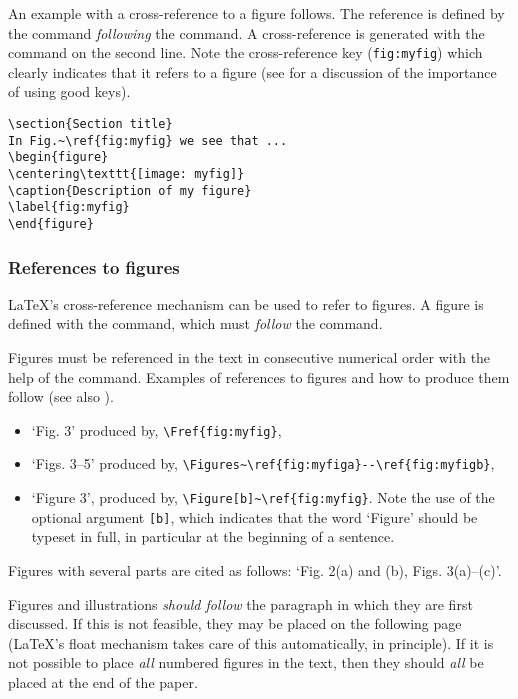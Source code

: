 \documentclass[12pt,twoside,a4paper]{cernrep}
\begin{document}
An example with a cross-reference to a figure follows. The reference
is defined by the  command \emph{following} the
 command. A cross-reference is generated with the
 command on the second line. Note the cross-reference key
(\texttt{fig:myfig}) which clearly indicates that it refers to a
figure (see  for a discussion of the importance of
using good keys).
\begin{verbatim}
\section{Section title}
In Fig.~\ref{fig:myfig} we see that ...
\begin{figure}
\centering\texttt{[image: myfig]}
\caption{Description of my figure}
\label{fig:myfig}
\end{figure}
\end{verbatim}

\subsubsection{References to figures}

\LaTeX's cross-reference mechanism can be used to refer to figures.  A
figure is defined with the  command, which must
\emph{follow} the  command.

Figures must be referenced in the text in consecutive numerical order
with the help of the  command. Examples of references to
figures and how to produce them follow (see also ).
\begin{itemize}
\item `Fig. 3' produced by, \eg \verb!\Fref{fig:myfig}!,
\item `Figs. 3--5' produced by, \eg
       \verb!\Figures~\ref{fig:myfiga}--\ref{fig:myfigb}!,
\item `Figure 3', produced by, \eg \verb!\Figure[b]~\ref{fig:myfig}!. 
       Note the use of the optional argument \texttt{[b]}, which
       indicates that the word `Figure' should be typeset in full,
       in particular at the beginning of a sentence.
\end{itemize}
Figures with several parts are cited as follows: `Fig. 2(a) and (b),
Figs. 3(a)--(c)'.

Figures and illustrations \emph{should follow} the paragraph in which
they are first discussed.  If this is not feasible, they may be placed
on the following page (\LaTeX{}'s float mechanism takes care of this
automatically, in principle). If it is not possible to place
\emph{all} numbered figures in the text, then they should \emph{all}
be placed at the end of the paper.
\end{document}
